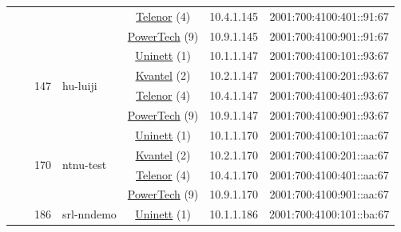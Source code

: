 \begin{small}
\begin{center}
\begin{longtable}{|c|c|c|c|c|c|c|c|}
  &  &  &  & \multicolumn{2}{|c|}{\tiny{\href{https://www.telenor.no}{Telenor} (4)}} & \tiny{10.4.1.145} & \tiny{2001:700:4100:401::91:67} \\* \cline{5-5}\cline{6-6}\cline{7-7}\cline{8-8}
  &  &  &  & \multicolumn{2}{|c|}{\tiny{\href{http://www.powertech.no}{PowerTech} (9)}} & \tiny{10.9.1.145} & \tiny{2001:700:4100:901::91:67} \\* \cline{3-3}\cline{4-4}\cline{5-5}\cline{6-6}\cline{7-7}\cline{8-8}
  &  & \multirow{4}{*}{\tiny{147}} & \multicolumn{1}{|l|}{\multirow{4}{*}{\tiny{hu-luiji}}} & \multicolumn{2}{|c|}{\tiny{\href{https://www.uninett.no}{Uninett} (1)}} & \tiny{10.1.1.147} & \tiny{2001:700:4100:101::93:67} \\* \cline{5-5}\cline{6-6}\cline{7-7}\cline{8-8}
  &  &  &  & \multicolumn{2}{|c|}{\tiny{\href{http://kvantel.no}{Kvantel} (2)}} & \tiny{10.2.1.147} & \tiny{2001:700:4100:201::93:67} \\* \cline{5-5}\cline{6-6}\cline{7-7}\cline{8-8}
  &  &  &  & \multicolumn{2}{|c|}{\tiny{\href{https://www.telenor.no}{Telenor} (4)}} & \tiny{10.4.1.147} & \tiny{2001:700:4100:401::93:67} \\* \cline{5-5}\cline{6-6}\cline{7-7}\cline{8-8}
  &  &  &  & \multicolumn{2}{|c|}{\tiny{\href{http://www.powertech.no}{PowerTech} (9)}} & \tiny{10.9.1.147} & \tiny{2001:700:4100:901::93:67} \\* \cline{3-3}\cline{4-4}\cline{5-5}\cline{6-6}\cline{7-7}\cline{8-8}
  &  & \multirow{4}{*}{\tiny{170}} & \multicolumn{1}{|l|}{\multirow{4}{*}{\tiny{ntnu-test}}} & \multicolumn{2}{|c|}{\tiny{\href{https://www.uninett.no}{Uninett} (1)}} & \tiny{10.1.1.170} & \tiny{2001:700:4100:101::aa:67} \\* \cline{5-5}\cline{6-6}\cline{7-7}\cline{8-8}
  &  &  &  & \multicolumn{2}{|c|}{\tiny{\href{http://kvantel.no}{Kvantel} (2)}} & \tiny{10.2.1.170} & \tiny{2001:700:4100:201::aa:67} \\* \cline{5-5}\cline{6-6}\cline{7-7}\cline{8-8}
  &  &  &  & \multicolumn{2}{|c|}{\tiny{\href{https://www.telenor.no}{Telenor} (4)}} & \tiny{10.4.1.170} & \tiny{2001:700:4100:401::aa:67} \\* \cline{5-5}\cline{6-6}\cline{7-7}\cline{8-8}
  &  &  &  & \multicolumn{2}{|c|}{\tiny{\href{http://www.powertech.no}{PowerTech} (9)}} & \tiny{10.9.1.170} & \tiny{2001:700:4100:901::aa:67} \\* \cline{3-3}\cline{4-4}\cline{5-5}\cline{6-6}\cline{7-7}\cline{8-8}
  &  & \multirow{4}{*}{\tiny{186}} & \multicolumn{1}{|l|}{\multirow{4}{*}{\tiny{srl-nndemo}}} & \multicolumn{2}{|c|}{\tiny{\href{https://www.uninett.no}{Uninett} (1)}} & \tiny{10.1.1.186} & \tiny{2001:700:4100:101::ba:67} \\* \cline{5-5}\cline{6-6}\cline{7-7}\cline{8-8}

\end{longtable}
\end{center}
\end{small}
